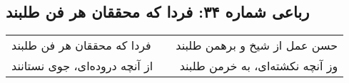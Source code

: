 \begin{center}
\section*{رباعی شماره ۳۴: فردا که محققان هر فن طلبند}
\label{sec:034}
\begin{longtable}{l p{0.5cm} r}
فردا که محققان هر فن طلبند
&&
حسن عمل از شیخ و برهمن طلبند
\\
از آنچه دروده‌ای، جوی نستانند
&&
وز آنچه نکشته‌ای، به خرمن طلبند
\\
\end{longtable}
\end{center}
